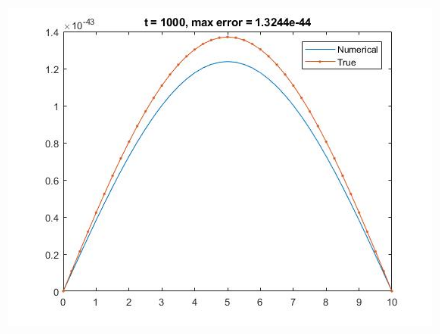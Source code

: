 \begin{figure}
\begin{minipage}{0.5\textwidth}
\includegraphics[width = \textwidth]{17.jpg}
\end{minipage}
\end{figure}

